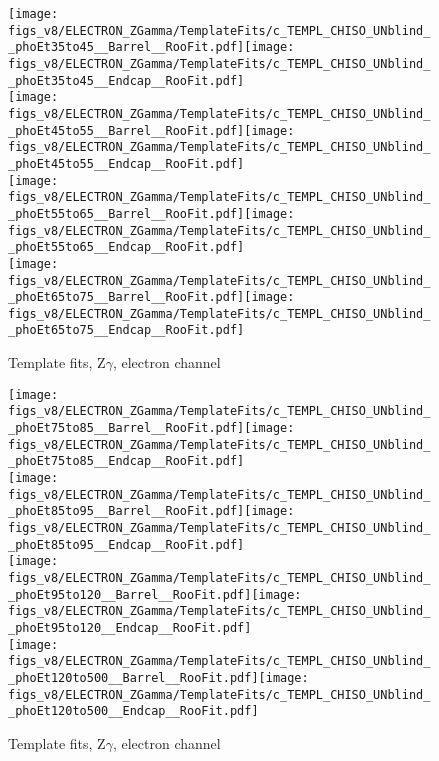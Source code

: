 \begin{figure}[htb]
  \begin{center}
   \texttt{[image: figs\_v8/ELECTRON\_ZGamma/TemplateFits/c\_TEMPL\_CHISO\_UNblind\_\_phoEt35to45\_\_Barrel\_\_RooFit.pdf]}\texttt{[image: figs\_v8/ELECTRON\_ZGamma/TemplateFits/c\_TEMPL\_CHISO\_UNblind\_\_phoEt35to45\_\_Endcap\_\_RooFit.pdf]}\\
   \texttt{[image: figs\_v8/ELECTRON\_ZGamma/TemplateFits/c\_TEMPL\_CHISO\_UNblind\_\_phoEt45to55\_\_Barrel\_\_RooFit.pdf]}\texttt{[image: figs\_v8/ELECTRON\_ZGamma/TemplateFits/c\_TEMPL\_CHISO\_UNblind\_\_phoEt45to55\_\_Endcap\_\_RooFit.pdf]}\\
   \texttt{[image: figs\_v8/ELECTRON\_ZGamma/TemplateFits/c\_TEMPL\_CHISO\_UNblind\_\_phoEt55to65\_\_Barrel\_\_RooFit.pdf]}\texttt{[image: figs\_v8/ELECTRON\_ZGamma/TemplateFits/c\_TEMPL\_CHISO\_UNblind\_\_phoEt55to65\_\_Endcap\_\_RooFit.pdf]}\\
   \texttt{[image: figs\_v8/ELECTRON\_ZGamma/TemplateFits/c\_TEMPL\_CHISO\_UNblind\_\_phoEt65to75\_\_Barrel\_\_RooFit.pdf]}\texttt{[image: figs\_v8/ELECTRON\_ZGamma/TemplateFits/c\_TEMPL\_CHISO\_UNblind\_\_phoEt65to75\_\_Endcap\_\_RooFit.pdf]}\\
  \label{fig:templateFits_CHISO_ELECTRON_ZGamma_2}
  \caption{Template fits, Z$\gamma$, electron channel}
  \end{center}
\end{figure}

\begin{figure}[htb]
  \begin{center}
   \texttt{[image: figs\_v8/ELECTRON\_ZGamma/TemplateFits/c\_TEMPL\_CHISO\_UNblind\_\_phoEt75to85\_\_Barrel\_\_RooFit.pdf]}\texttt{[image: figs\_v8/ELECTRON\_ZGamma/TemplateFits/c\_TEMPL\_CHISO\_UNblind\_\_phoEt75to85\_\_Endcap\_\_RooFit.pdf]}\\
   \texttt{[image: figs\_v8/ELECTRON\_ZGamma/TemplateFits/c\_TEMPL\_CHISO\_UNblind\_\_phoEt85to95\_\_Barrel\_\_RooFit.pdf]}\texttt{[image: figs\_v8/ELECTRON\_ZGamma/TemplateFits/c\_TEMPL\_CHISO\_UNblind\_\_phoEt85to95\_\_Endcap\_\_RooFit.pdf]}\\
   \texttt{[image: figs\_v8/ELECTRON\_ZGamma/TemplateFits/c\_TEMPL\_CHISO\_UNblind\_\_phoEt95to120\_\_Barrel\_\_RooFit.pdf]}\texttt{[image: figs\_v8/ELECTRON\_ZGamma/TemplateFits/c\_TEMPL\_CHISO\_UNblind\_\_phoEt95to120\_\_Endcap\_\_RooFit.pdf]}\\
   \texttt{[image: figs\_v8/ELECTRON\_ZGamma/TemplateFits/c\_TEMPL\_CHISO\_UNblind\_\_phoEt120to500\_\_Barrel\_\_RooFit.pdf]}\texttt{[image: figs\_v8/ELECTRON\_ZGamma/TemplateFits/c\_TEMPL\_CHISO\_UNblind\_\_phoEt120to500\_\_Endcap\_\_RooFit.pdf]}\\
  \label{fig:templateFits_CHISO_ELECTRON_ZGamma_3}
  \caption{Template fits, Z$\gamma$, electron channel}
  \end{center}
\end{figure}

